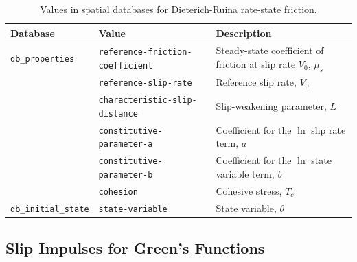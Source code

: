 \noindent \begin{center}
\begin{table}[H]
\noindent \centering{}\caption{\label{tab:rate:state:ageing:properties:statevars}Values in spatial
databases for Dieterich-Ruina rate-state friction.}
\medskip{}
\begin{tabular}{|l|l|>{\raggedright}p{2.5in}|}
\hline 
\textbf{Database} & \textbf{Value} & \textbf{Description}\tabularnewline
\hline 
\hline 
\texttt{db\_properties} & \texttt{reference-friction-coefficient} & Steady-state coefficient of friction at slip rate $V_{0}$, $\mu_{s}$\tabularnewline
\cline{2-3} 
 & \texttt{reference-slip-rate} & Reference slip rate, $V_{0}$\tabularnewline
\cline{2-3} 
 & \texttt{characteristic-slip-distance} & Slip-weakening parameter, $L$\tabularnewline
\cline{2-3} 
 & \texttt{constitutive-parameter-a} & Coefficient for the $\ln$ slip rate term, $a$\tabularnewline
\cline{2-3} 
 & \texttt{constitutive-parameter-b} & Coefficient for the $\ln$ state variable term, $b$\tabularnewline
\cline{2-3} 
 & \texttt{cohesion} & Cohesive stress, $T_{c}$\tabularnewline
\hline 
\texttt{db\_initial\_state} & \texttt{state-variable} & State variable, $\theta$\tabularnewline
\hline 
\end{tabular}
\end{table}

\par\end{center}


\subsection{\label{sec:fault:cohesive:impulses}Slip Impulses for Green's Functions}

